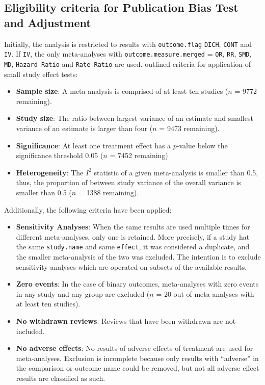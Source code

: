 \documentclass[11pt,a4paper,twoside]{book}\usepackage[]{graphicx}\usepackage[]{color}
\begin{document}
\subsection{Eligibility criteria for Publication Bias Test and Adjustment} 

Initially, the analysis is restricted to results with \texttt{outcome.flag} \texttt{DICH}, \texttt{CONT} and \texttt{IV}. If \texttt{IV}, the only meta-analyses with \texttt{outcome.measure.merged} = \texttt{OR}, \texttt{RR}, \texttt{SMD}, \texttt{MD}, \texttt{Hazard Ratio} and \texttt{Rate Ratio} are used. 
\citet{Ioannidis2007} outlined criteria for application of small study effect tests:
\begin{itemize}
\item \textbf{Sample size}: A meta-analysis is comprised of at least ten studies ($n$ = 9772 remaining). 
\item \textbf{Study size}: The ratio between largest variance of an estimate and smallest variance of an estimate is larger than four ($n$ = 9473 remaining).
\item \textbf{Significance}: At least one treatment effect has a $p$-value below the significance threshold 0.05 ($n$ = 7452 remaining)
\item \textbf{Heterogeneity}: The $I^2$ statistic of a given meta-analysis is smaller than 0.5, thus, the proportion of between study variance of the overall variance is smaller than 0.5 ($n$ = 1388 remaining).
\end{itemize}
Additionally, the following criteria have been applied:
\begin{itemize}
\item \textbf{Sensitivity Analyses}: When the same results are used multiple times for different meta-analyses, only one is retained. More precisely, if a study hat the same \texttt{study.name} and same \texttt{effect}, it was considered a duplicate, and the smaller meta-analysis of the two was excluded. The intention is to exclude sensitivity analyses which are operated on subsets of the available results.
\item \textbf{Zero events}: In the case of binary outcomes, meta-analyses with zero events in any study and any group are excluded ($n$ = 20 out of meta-analyses with at least ten studies).
\item \textbf{No withdrawn reviews}: Reviews that have been withdrawn are not included.
\item \textbf{No adverse effects}: No results of adverse effects of treatment are used for meta-analyses. Exclusion is incomplete because only results with ``adverse'' in the comparison or outcome name could be removed, but not all adverse effect results are classified as such.
\end{itemize}
\end{document}
